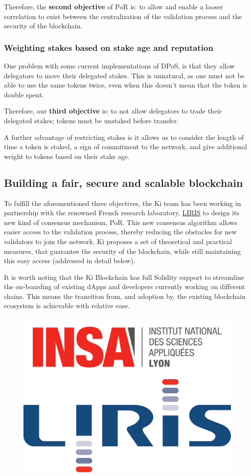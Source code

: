 Therefore, the \textbf{second objective} of PoR is: to allow and enable a looser correlation to exist between the centralization of the validation process and the security of the blockchain.

\subsubsection{Weighting stakes based on stake age and reputation}
\label{sec:kiblockchainstake}
One problem with some current implementations of DPoS, is that they allow delegators to move their delegated stakes. This is unnatural, as one must not be able to use the same tokens twice, even when this doesn't mean that the token is double spent.  

Therefore, our \textbf{third objective} is: to not allow delegators to trade their delegated stakes; tokens must be unstaked before transfer.

A further advantage of restricting stakes is it allows us to consider the length of time a token is staked, a sign of commitment to the network, and give additional weight to tokens based on their stake age.

\subsection{Building a fair, secure and scalable blockchain}
\label{sec:kiblockchainproposal}
To fulfill the aforementioned three objectives, the Ki team has been working in partnership with the renowned French research laboratory, \href{https://liris.cnrs.fr}{LIRIS} to design its new kind of consensus mechanism, PoR. This new consensus algorithm allows easier access to the validation process, thereby reducing the obstacles for new validators to join the network. Ki proposes a set of theoretical and practical measures, that guarantee the security of the blockchain, while still maintaining this easy access (addressed in detail below). 

It is worth noting that the Ki Blockchain has full Solidity support to streamline the on-boarding of existing dApps and developers currently working on different chains. This means the transition from, and adoption by, the existing blockchain ecosystem is achievable with relative ease.  

\begin{figure}[ht]
    \centering
	\includegraphics[width=0.25\linewidth, trim= 0cm 0cm 0cm 0cm, clip, valign=c]{Figures/INSA.png}
	\includegraphics[width=0.25\linewidth, trim= 0cm 0cm 0cm 0cm, clip, valign=c]{Figures/liris.png}
	\label{fig:partners}
\end{figure}

